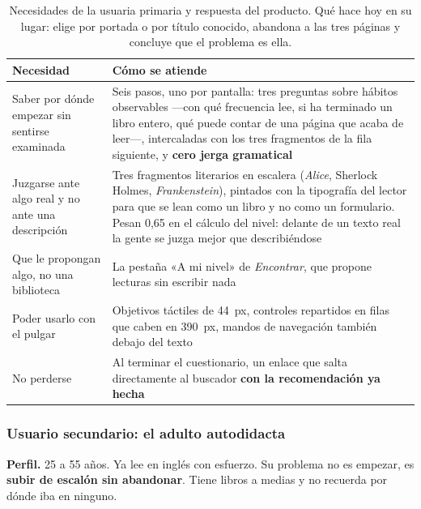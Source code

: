 \documentclass[11pt,a4paper]{article}
\begin{document}
\begin{table}[htbp]
\centering
\small
\begin{tabularx}{\textwidth}{@{}L{5.0cm} Y@{}}
\toprule
\textbf{Necesidad} & \textbf{Cómo se atiende} \\
\midrule
Saber por dónde empezar sin sentirse examinada &
Seis pasos, uno por pantalla: tres preguntas sobre hábitos observables —con qué
frecuencia lee, si ha terminado un libro entero, qué puede contar de una página que acaba
de leer—, intercaladas con los tres fragmentos de la fila siguiente, y
\textbf{cero jerga gramatical} \\
\addlinespace
Juzgarse ante algo real y no ante una descripción &
Tres fragmentos literarios en escalera (\emph{Alice}, Sherlock Holmes,
\emph{Frankenstein}), pintados con la tipografía del lector para que se lean como un
libro y no como un formulario. Pesan 0,65 en el cálculo del nivel: delante de un texto
real la gente se juzga mejor que describiéndose \\
\addlinespace
Que le propongan algo, no una biblioteca &
La pestaña «A mi nivel» de \emph{Encontrar}, que propone lecturas sin escribir nada \\
\addlinespace
Poder usarlo con el pulgar &
Objetivos táctiles de 44~px, controles repartidos en filas que caben en 390~px, mandos
de navegación también debajo del texto \\
\addlinespace
No perderse &
Al terminar el cuestionario, un enlace que salta directamente al buscador \textbf{con
la recomendación ya hecha} \\
\bottomrule
\end{tabularx}
\caption{Necesidades de la usuaria primaria y respuesta del producto. Qué hace hoy en
su lugar: elige por portada o por título conocido, abandona a las tres páginas y
concluye que el problema es ella.}
\label{cuad:primaria}
\end{table}

\subsubsection{Usuario secundario: el adulto autodidacta}

\textbf{Perfil.} 25 a 55 años. Ya lee en inglés con esfuerzo. Su problema no es
empezar, es \textbf{subir de escalón sin abandonar}. Tiene libros a medias y no
recuerda por dónde iba en ninguno.
\end{document}
